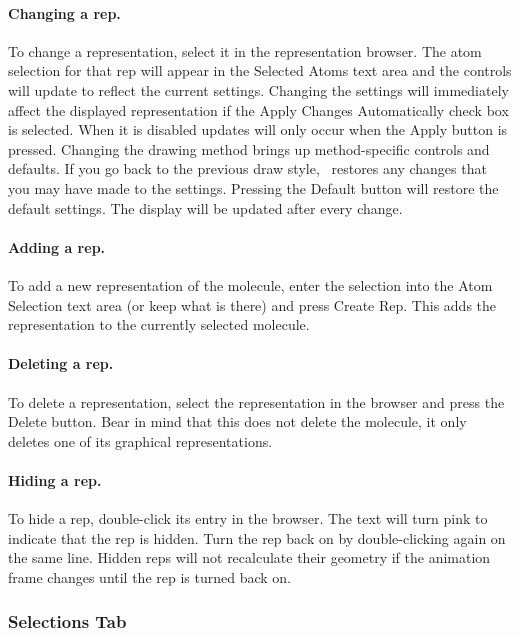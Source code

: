 \paragraph{Changing a rep.}
To change a representation, select it in the representation browser.  
The atom selection for that rep will
appear in the {\sf Selected Atoms} text area and the controls will update
to reflect the current settings.  Changing the settings will immediately
affect the displayed representation if the 
{\sf Apply Changes Automatically} check box is selected.
When it is disabled updates will only occur when the {\sf Apply} button 
is pressed.  
Changing the drawing method brings up method-specific controls and defaults.
If you go back to the previous draw style,
\VMD\ restores any changes that you may have made to the settings.  
Pressing the {\sf Default} button will restore the default settings.
The display will be updated after every change.  

\paragraph{Adding a rep.}
To add a new representation of the molecule, 
enter the selection into the {\sf Atom Selection} text area (or keep what is
there) and press {\sf Create Rep}.  This adds the representation to the
currently selected molecule.

\paragraph{Deleting a rep.}
To delete a representation, 
select the representation in the browser and press the {\sf Delete} button.  
Bear in mind that this does not delete the molecule, it only deletes 
one of its graphical representations.

\paragraph{Hiding a rep.}
To hide a rep, double-click its entry in the browser.
The text will turn pink to indicate that the rep is hidden.
Turn the rep back on by double-clicking again on the same line.
Hidden reps will not recalculate their geometry if the
animation frame changes until the rep is turned back on.

\subsubsection{Selections Tab}

